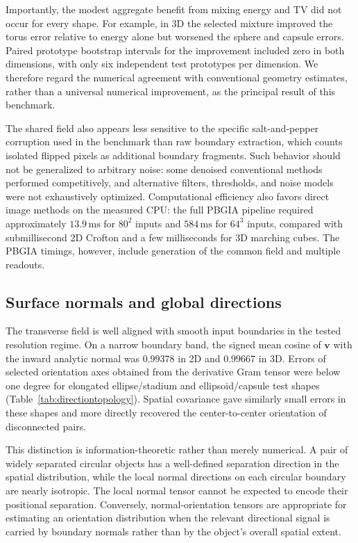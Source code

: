 \documentclass[11pt,a4paper]{article}
\newcommand{\vv}{\bm v}
\begin{document}
Importantly, the modest aggregate benefit from mixing energy and TV did not occur for every shape. For example, in 3D the selected mixture improved the torus error relative to energy alone but worsened the sphere and capsule errors. Paired prototype bootstrap intervals for the improvement included zero in both dimensions, with only six independent test prototypes per dimension. We therefore regard the numerical agreement with conventional geometry estimates, rather than a universal numerical improvement, as the principal result of this benchmark.

The shared field also appears less sensitive to the specific salt-and-pepper corruption used in the benchmark than raw boundary extraction, which counts isolated flipped pixels as additional boundary fragments. Such behavior should not be generalized to arbitrary noise: some denoised conventional methods performed competitively, and alternative filters, thresholds, and noise models were not exhaustively optimized. Computational efficiency also favors direct image methods on the measured CPU: the full PBGIA pipeline required approximately \(13.9\,\mathrm{ms}\) for \(80^2\) inputs and \(584\,\mathrm{ms}\) for \(64^3\) inputs, compared with submillisecond 2D Crofton and a few milliseconds for 3D marching cubes. The PBGIA timings, however, include generation of the common field and multiple readouts.

\subsection{Surface normals and global directions}\label{subsec:impl:directions}
The transverse field is well aligned with smooth input boundaries in the tested resolution regime. On a narrow boundary band, the signed mean cosine of \(\vv\) with the inward analytic normal was \(0.99378\) in 2D and \(0.99667\) in 3D. Errors of selected orientation axes obtained from the derivative Gram tensor were below one degree for elongated ellipse/stadium and ellipsoid/capsule test shapes (Table~\ref{tab:directiontopology}). Spatial covariance gave similarly small errors in these shapes and more directly recovered the center-to-center orientation of disconnected pairs.

This distinction is information-theoretic rather than merely numerical. A pair of widely separated circular objects has a well-defined separation direction in the spatial distribution, while the local normal directions on each circular boundary are nearly isotropic. The local normal tensor cannot be expected to encode their positional separation. Conversely, normal-orientation tensors are appropriate for estimating an orientation distribution when the relevant directional signal is carried by boundary normals rather than by the object's overall spatial extent.
\end{document}
